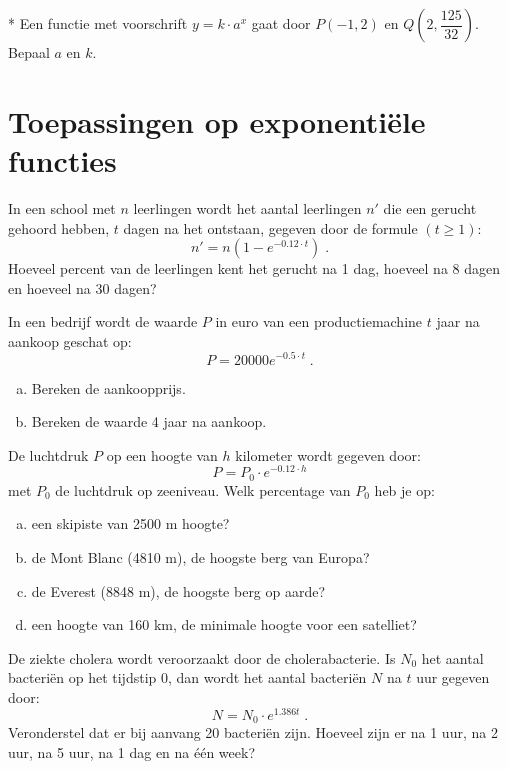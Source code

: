 \documentclass[12pt,twoside]{article}
\begin{document}
\begin{oefening}*
Een functie met voorschrift $y=k\cdot a^x$ gaat door $P(-1,2)$ en $Q(2,\dfrac{125}{32})$. Bepaal $a$ en $k$.
\end{oefening}

\section{Toepassingen op exponentiële functies}

\begin{oefening}
In een school met $n$ leerlingen wordt het aantal leerlingen $n'$ die een gerucht gehoord hebben, $t$ dagen na het ontstaan, gegeven door de formule $(t\geq 1)$:
$$n' = n(1-e^{-0.12\cdot t})\;.$$
Hoeveel percent van de leerlingen kent het gerucht na 1 dag, hoeveel na 8 dagen en hoeveel na 30 dagen?
\end{oefening}


\begin{oefening}
In een bedrijf wordt de waarde $P$ in euro van een productiemachine $t$ jaar na aankoop geschat op:
$$P = 20000 e^{-0.5\cdot t}\;.$$
\begin{enumerate}[(a)]
  \item Bereken de aankoopprijs.
  \item Bereken de waarde 4 jaar na aankoop.
\end{enumerate}
\end{oefening}

\begin{oefening}
De luchtdruk $P$ op een hoogte van $h$ kilometer wordt gegeven door:
$$P = P_0\cdot e^{-0.12\cdot h}$$
met $P_0$ de luchtdruk op zeeniveau. Welk percentage van $P_0$ heb je op:
\begin{enumerate}[(a)]
  \item een skipiste van 2500 m hoogte?
  \item de Mont Blanc (4810 m), de hoogste berg van Europa?
  \item de Everest (8848 m), de hoogste berg op aarde?
  \item een hoogte van 160 km, de minimale hoogte voor een satelliet?
\end{enumerate}
\end{oefening}

\begin{oefening}
De ziekte cholera wordt veroorzaakt door de cholerabacterie. Is $N_0$ het aantal bacteriën op het tijdstip 0, dan wordt het aantal bacteriën $N$ na $t$ uur gegeven door:
$$N=N_0\cdot e^{1.386 t}\;.$$
Veronderstel dat er bij aanvang 20 bacteriën zijn. Hoeveel zijn er na 1 uur, na 2 uur, na 5 uur, na 1 dag en na één week?
\end{oefening}
\end{document}
